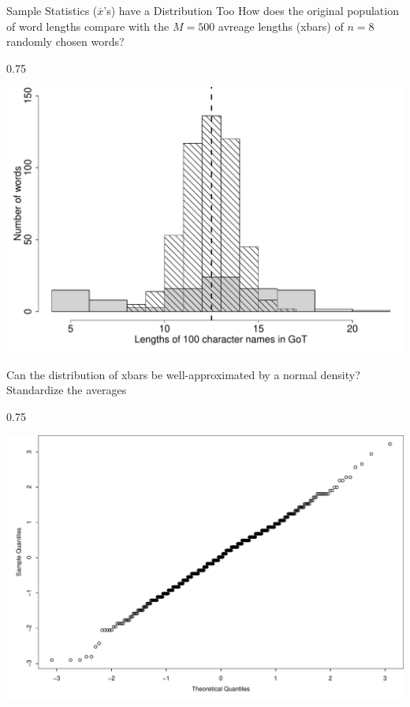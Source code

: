 \documentclass{beamer}\usepackage[]{graphicx}\usepackage[]{color}
\newenvironment{knitrout}{}{} %
\renewenvironment{knitrout}{\begin{spacing}{0.75}\begin{tiny}}{\end{tiny}\end{spacing}}
\newcommand{\xbar}{\overline{x}}
\begin{document}
\begin{frame}{Sample Statistics ($\xbar$'s) have a Distribution Too\;\;}
How does the original population of word lengths compare
with the $M=500$ avreage lengths (xbars) of $n=8$ randomly chosen words?
\begin{knitrout}\small
{}\color{fgcolor}

{\centering \includegraphics[width=0.79\linewidth]{figure/graphics-unnamed-chunk-39-1} 

}



\end{knitrout}

\newpage

Can the distribution of xbars be well-approximated by a normal density?
Standardize the averages
\begin{knitrout}\small
{}\color{fgcolor}

{\centering \includegraphics[width=0.79\linewidth]{figure/graphics-unnamed-chunk-40-1} 

}



\end{knitrout}

\newpage


\end{frame}
\end{document}
